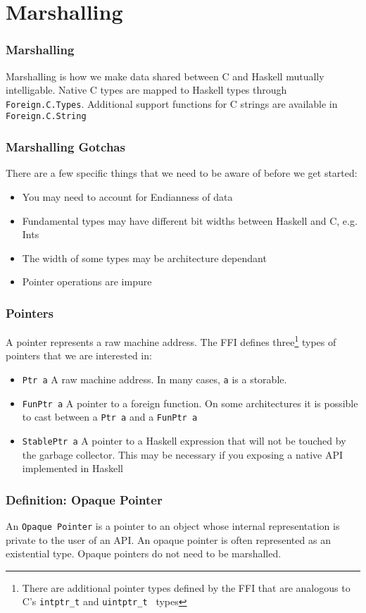 \documentclass{beamer}
\begin{document}
\section{Marshalling}
\begin{frame}
    \frametitle{Marshalling}
    Marshalling is how we make data shared between C and Haskell mutually
    intelligable.  Native C types are mapped to Haskell types through
    {\tt Foreign.C.Types}.  Additional support functions for C strings are
    available in {\tt Foreign.C.String}
\end{frame}
\begin{frame}
    \frametitle{Marshalling Gotchas}
    There are a few specific things that we need to be aware of before we get
    started:
    \begin{itemize}
        \item{You may need to account for Endianness of data}
        \item{Fundamental types may have different bit widths between Haskell
            and C, e.g. Ints}
        \item{The width of some types may be architecture dependant}
        \item{Pointer operations are impure}
    \end{itemize}
\end{frame}
\begin{frame}
    \frametitle{Pointers}
    A pointer represents a raw machine address.  The FFI defines
    three\footnote{There are additional pointer types defined by
        the FFI that are analogous to C's {\tt intptr\_t} and {\tt uintptr\_t
    } types} types of
    pointers that we are interested in:
    \begin{itemize}
        \item{{\tt Ptr a} A raw machine address.  In many cases, {\tt a} is a
            storable.}
        \item{{\tt FunPtr a} A pointer to a foreign function.  On some
                architectures it is possible to cast between a {\tt Ptr a} and
            a {\tt FunPtr a}}
        \item{{\tt StablePtr a} A pointer to a Haskell expression that will not
                be touched by the garbage collector.  This may be necessary if
            you exposing a native API implemented in Haskell}
    \end{itemize}
\end{frame}
\begin{frame}
    \frametitle{Definition: Opaque Pointer}
    An {\tt Opaque Pointer} is a pointer to an object whose internal
    representation is private to the user of an API. An opaque pointer is
    often represented as an existential type.  Opaque pointers do not need to
    be marshalled.
\end{frame}
\end{document}
